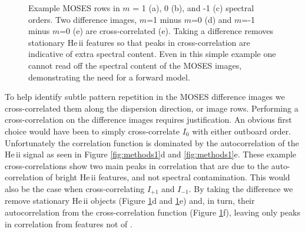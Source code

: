 \begin{figure}
 	 		\caption{Example MOSES rows in $m$ = 1 (a), 0 (b), and -1 (c) spectral orders.  Two difference images, $m$=1 minus $m$=0 (d) and $m$=-1 minus $m$=0 (e) are cross-correlated (e).  Taking a difference removes stationary He\,{\sc ii} features so that peaks in cross-correlation are indicative of extra spectral content.  Even in this simple example one cannot read off the spectral content of the MOSES images, demonstrating the need for a forward model.}
 	 		\label{fig:methods2}
 	 	\end{figure}
	
        To help identify subtle pattern repetition in the MOSES difference images we cross-correlated them along the dispersion direction, or image rows.   
        Performing a cross-correlation on the difference images requires justification.  
        An obvious first choice would have been to simply cross-correlate $I_0$ with either outboard order.  
        Unfortunately the correlation function is dominated by the autocorrelation of the He\,{\sc ii} signal as seen in Figure \ref{fig:methods1}d and \ref{fig:methods1}e.  
        These example cross-correlations show two main peaks in correlation that are due to the auto-correlation of bright He\,{\sc ii} features, and not spectral contamination.  
        This would also be the case when cross-correlating $I_{+1}$ and $I_{-1}$.  
        By taking the difference we remove stationary He\,{\sc ii} objects (Figure \ref{fig:methods2}d and \ref{fig:methods2}e) and, in turn, their autocorrelation from the cross-correlation function (Figure \ref{fig:methods2}f), leaving only peaks in correlation from features not of \heii.
 	
